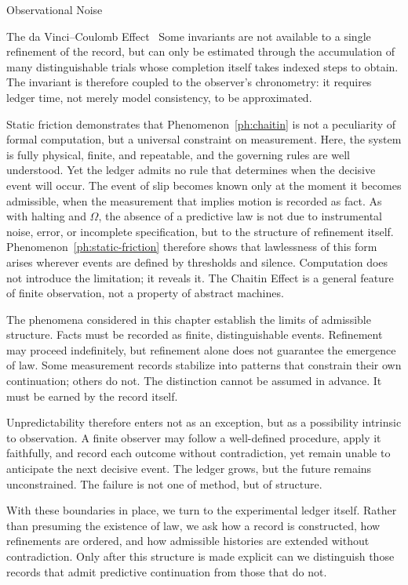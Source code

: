 \begin{coda}{Observational Noise}
\begin{phenom}{The da Vinci--Coulomb Effect~\cite{davinci1493,coulomb1785}}
\PhConstraint
Some invariants are not available to a single refinement of the record, but can
only be estimated through the accumulation of many distinguishable trials whose
completion itself takes indexed steps to obtain. The invariant is therefore
coupled to the observer's chronometry: it requires ledger time, not merely model
consistency, to be approximated.

\PhConsequence
Static friction demonstrates that Phenomenon~\ref{ph:chaitin} is not a peculiarity of
formal computation, but a universal constraint on measurement.
Here, the system is fully physical, finite, and repeatable, and the governing
rules are well understood. Yet the ledger admits no rule that determines
when the decisive event will occur. The event of slip becomes known only
at the moment it becomes admissible, when the measurement that implies motion is 
recorded as fact. As with
halting and $\Omega$, the absence of a predictive law is not due to instrumental noise, error,
or incomplete specification, but to the structure of refinement itself. 
Phenomenon~\ref{ph:static-friction} therefore shows that lawlessness of this form arises
wherever events are defined by thresholds and silence. Computation does not
introduce the limitation; it reveals it. The Chaitin Effect is a general feature
of finite observation, not a property of abstract machines.

\end{phenom}


The phenomena considered in this chapter establish the limits of admissible
structure. Facts must be recorded as finite, distinguishable events. Refinement
may proceed indefinitely, but refinement alone does not guarantee the emergence
of law. Some measurement records stabilize into patterns that constrain their
own continuation; others do not. The distinction cannot be assumed in advance.
It must be earned by the record itself.

Unpredictability therefore enters not as an exception, but as a possibility
intrinsic to observation. A finite observer may follow a well-defined
procedure, apply it faithfully, and record each outcome without contradiction,
yet remain unable to anticipate the next decisive event. The ledger grows, but
the future remains unconstrained. The failure is not one of method, but of
structure.

With these boundaries in place, we turn to the experimental ledger itself.
Rather than presuming the existence of law, we ask how a record is constructed,
how refinements are ordered, and how admissible histories are extended without
contradiction. Only after this structure is made explicit can we distinguish
those records that admit predictive continuation from those that do not.


\end{coda}
